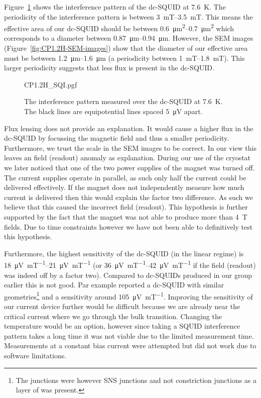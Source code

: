 Figure~\ref{fig:CP1.2H-SQUID-SQI} shows the interference pattern of the dc-SQUID at \qty{7.6}{\kelvin}. The periodicity of the interference pattern is between \qtyrange{3}{3.5}{\milli\tesla}. This means the effective area of our dc-SQUID should be between \qtyrange{0.6}{0.7}{\square\micro\meter} which corresponds to a diameter between \qtyrange{0.87}{0.94}{\micro\meter}. However, the SEM images (Figure~\ref{fig:CP1.2H-SEM-images}) show that the diameter of our effective area must be between \qtyrange{1.2}{1.6}{\micro\meter} (a periodicity between \qtyrange{1}{1.8}{\milli\tesla}). This larger periodicity suggests that less flux is present in the dc-SQUID.

\begin{figure}[ht!]
	\centering
	{CP1.2H_SQI.pgf}
	\caption{The interference pattern measured over the dc-SQUID at \qty{7.6}{\kelvin}. The black lines are equipotential lines spaced \qty{5}{\micro\volt} apart.}
	\label{fig:CP1.2H-SQUID-SQI}
\end{figure}

Flux lensing\cite{prigozhin3DSimulationSuperconducting2018} does not provide an explanation. It would cause a higher flux in the dc-SQUID by focussing the magnetic field and thus a smaller periodicity. Furthermore, we trust the scale in the SEM images to be correct. In our view this leaves an field (readout) anomaly as explanation. During our use of the cryostat we later noticed that one of the two power supplies of the magnet was turned off. The current supplies operate in parallel, as such only half the current could be delivered effectively. If the magnet does not independently measure how much current is delivered then this would explain the factor two difference. As such we believe that this caused the incorrect field (readout). This hypothesis is further supported by the fact that the magnet was not able to produce more than \qty{4}{\tesla} fields. Due to time constraints however we have not been able to definitively test this hypothesis.

Furthermore, the highest sensitivity of the dc-SQUID (in the linear regime) is \qtyrange{18}{21}{\micro\volt\per\milli\tesla} (or \qtyrange{36}{42}{\micro\volt\per\milli\tesla} if the field (readout) was indeed off by a factor two). Compared to dc-SQUIDs produced in our group earlier this is not good. Par example \cite{rogSQUIDontipMagneticMicroscopy2022} reported a dc-SQUID with similar geometries\footnote{The junctions were however SNS junctions and not constriction junctions as a layer of  was present.} and a sensitivity around \qty{105}{\micro\volt\per\milli\tesla}. Improving the sensitivity of our current device further would be difficult because we are already near the critical current where we go through the bulk transition. Changing the temperature would be an option, however since taking a SQUID interference pattern takes a long time it was not viable due to the limited measurement time. Measurements at a constant bias current were attempted but did not work due to software limitations.

